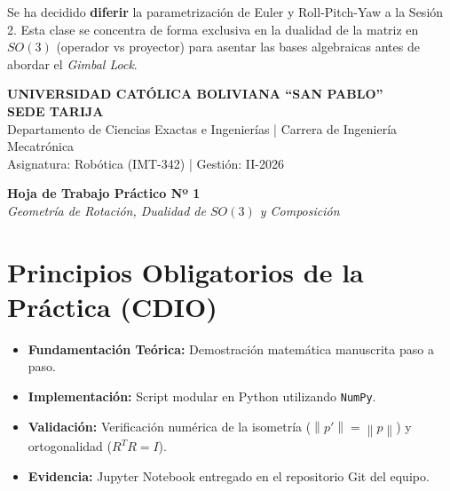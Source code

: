 \documentclass[11pt, a4paper]{article}
\begin{document}
\vspace{0.5cm}
\begin{tcolorbox}[colback=ucbblue!5!white, colframe=ucbblue, title=Ajuste de Diseño Didáctico]
Se ha decidido \textbf{diferir} la parametrización de Euler y Roll-Pitch-Yaw a la Sesión 2. Esta clase se concentra de forma exclusiva en la dualidad de la matriz en $SO(3)$ (operador vs proyector) para asentar las bases algebraicas antes de abordar el \textit{Gimbal Lock}.
\end{tcolorbox}

\newpage
\begin{center}
    \Large\textbf{\textcolor{ucbblue}{UNIVERSIDAD CAT\'OLICA BOLIVIANA ``SAN PABLO''}}\\
    \large\textbf{SEDE TARIJA}\\
    \vspace{0.2cm}
    \normalsize Departamento de Ciencias Exactas e Ingenierías | Carrera de Ingeniería Mecatrónica\\
    Asignatura: Robótica (IMT-342) | Gestión: II-2026
\end{center}

\vspace{0.4cm}
\begin{center}
    \Large\textbf{Hoja de Trabajo Práctico Nº 1}\\
    \large\textit{Geometría de Rotación, Dualidad de $SO(3)$ y Composición}
\end{center}
\vspace{0.4cm}

\section{Principios Obligatorios de la Práctica (CDIO)}
\begin{itemize}[label=\textcolor{ucbblue}{$\blacktriangleright$}, leftmargin=*]
    \item \textbf{Fundamentación Teórica:} Demostración matemática manuscrita paso a paso.
    \item \textbf{Implementación:} Script modular en Python utilizando \texttt{NumPy}.
    \item \textbf{Validación:} Verificación numérica de la isometría ($\left\|p'\right\| = \left\|p\right\|$) y ortogonalidad ($R^T R = I$).
    \item \textbf{Evidencia:} Jupyter Notebook entregado en el repositorio Git del equipo.
\end{itemize}
\end{document}
